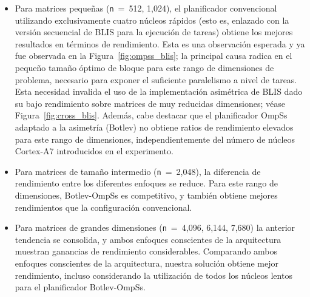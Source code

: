 \begin{itemize}
\item Para matrices pequeñas ({\tt n}~=~512, 1,024), el planificador
  convencional utilizando exclusivamente cuatro núcleos rápidos (esto es,
  enlazado con la versión secuencial de BLIS para la ejecución de tareas)
  obtiene los mejores resultados en términos de rendimiento.  Esta es una
  observación esperada y ya fue observada en la
  Figura~\ref{fig:ompss_blis}; la principal causa radica en el pequeño
  tamaño óptimo de bloque para este rango de dimensiones de problema,
  necesario para exponer el suficiente paralelismo a nivel de tareas. Esta
  necesidad invalida el uso de la implementación asimétrica de BLIS dado su
  bajo rendimiento sobre matrices de muy reducidas dimensiones; véase
  Figura~\ref{fig:cross_blis}.  Además, cabe destacar que el planificador
  OmpSs adaptado a la asimetría (Botlev) no obtiene ratios de rendimiento
  elevados para este rango de dimensiones, independientemente del número de
  núcleos Cortex-A7 introducidos en el experimento.

\item Para matrices de tamaño intermedio ({\tt n}~=~2,048), la diferencia
  de rendimiento entre los diferentes enfoques se reduce. Para este rango
  de dimensiones, Botlev-OmpSs es competitivo, y también obtiene mejores
  rendimientos que la configuración convencional.

\item Para matrices de grandes dimensiones ({\tt n}~=~4,096, 6,144, 7,680)
  la anterior tendencia se consolida, y ambos enfoques conscientes de la
  arquitectura muestran ganancias de rendimiento considerables. Comparando
  ambos enfoques conscientes de la arquitectura, nuestra solución obtiene
  mejor rendimiento, incluso considerando la utilización de todos los
  núcleos lentos para el planificador Botlev-OmpSs.

\end{itemize}

